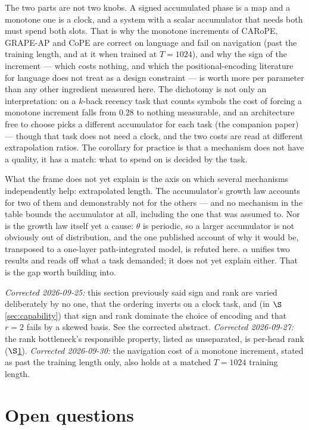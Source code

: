 \documentclass[11pt]{article}
\begin{document}
The two parts are not two knobs. A signed accumulated phase is a map and a monotone
one is a clock, and a system with a scalar accumulator that needs both must spend both
slots. That is why the monotone increments of CARoPE, GRAPE-AP and CoPE are correct on
language and fail on navigation (past the training length, and at it when trained at
$T=1024$), and why the sign of the
increment --- which costs nothing, and which the positional-encoding literature for
language does not treat as a design constraint --- is worth more per parameter than
any other ingredient measured here. The dichotomy is not only an interpretation: on a
$k$-back recency task that counts symbols the cost of forcing a monotone increment
falls from $0.28$ to nothing measurable, and an architecture free to choose picks a
different accumulator for each task (the companion paper) --- though that task does
not need a clock, and the two costs are read at different extrapolation ratios. The corollary for practice is that a
mechanism does not have a quality, it has a match: what to spend on is decided by
the task.

What the frame does not yet explain is the axis on which several mechanisms
independently help: extrapolated length. The accumulator's growth law accounts for
two of them and demonstrably not for the others --- and no mechanism in the table
bounds the accumulator at all, including the one that was assumed to. Nor is the
growth law itself yet a cause: $\theta$ is periodic, so a larger accumulator is not
obviously out of distribution, and the one published account of why it would be,
transposed to a one-layer path-integrated model, is refuted here. $\alpha$ unifies two
results and reads off what a task demanded; it does not yet explain either. That is
the gap worth building into.

\emph{Corrected 2026-09-25:} this section previously said sign and rank are varied
deliberately by no one, that the ordering inverts on a clock task, and (in
$\S$\ref{sec:capability}) that sign and rank dominate the choice of encoding and that
$r=2$ fails by a skewed basis. See the corrected abstract.
\emph{Corrected 2026-09-27:} the rank bottleneck's responsible property, listed as
unseparated, is per-head rank ($\S$\ref{sec:open}).
\emph{Corrected 2026-09-30:} the navigation cost of a monotone increment, stated as past
the training length only, also holds at a matched $T=1024$ training length.


\section{Open questions}
\label{sec:open}
\end{document}
